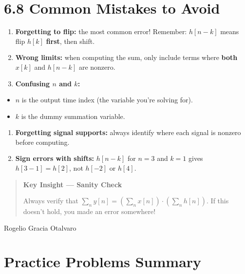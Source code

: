 \documentclass[11pt]{article}
\begin{document}
\section*{6.8 Common Mistakes to Avoid}

\begin{enumerate}
  \item \textbf{Forgetting to flip:} the most common error! Remember: $h[n-k]$ means flip $h[k]$ \textbf{first}, then shift.
  \item \textbf{Wrong limits:} when computing the sum, only include terms where \textbf{both} $x[k]$ and $h[n-k]$ are nonzero.
  \item \textbf{Confusing $n$ and $k$:}
\end{enumerate}
\begin{itemize}
  \item $n$ is the output time index (the variable you're solving for).
  \item $k$ is the dummy summation variable.
\end{itemize}
\begin{enumerate}
  \item \textbf{Forgetting signal supports:} always identify where each signal is nonzero before computing.
  \item \textbf{Sign errors with shifts:} $h[n-k]$ for $n=3$ and $k=1$ gives $h[3-1] = h[2]$, not $h[-2]$ or $h[4]$.
\end{enumerate}

\begin{quote}
\textbf{Key Insight — Sanity Check}

Always verify that $\sum_n y[n] = \left(\sum_n x[n]\right)\cdot\left(\sum_n h[n]\right)$. If this doesn't hold, you made an error somewhere!
\end{quote}

Rogelio Gracia Otalvaro

\section*{Practice Problems Summary}
\end{document}
